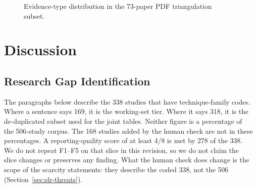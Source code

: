 \begin{figure}[tbp]
\centering
{}
\caption{Evidence-type distribution in the 73-paper PDF triangulation subset.}
\label{fig:pdf-evidence-dist}
\end{figure}


\section{Discussion}
\label{sec:slr-discussion}

\subsection{Research Gap Identification}
\label{sec:slr-gaps}

The paragraphs below describe the 338 studies that have technique-family
codes. Where a sentence says 169, it is the working-set tier. Where it says
318, it is the de-duplicated subset used for the joint tables. Neither
figure is a percentage of the 506-study corpus. The 168 studies added by the
human check are not in these percentages. A reporting-quality score of at
least 4/8 is met by 278 of the 338. We do not repeat F1--F5 on that slice
in this revision, so we do not claim the slice changes or preserves any
finding. What the human check does change is the scope of the scarcity
statements: they describe the coded 338, not the 506
(Section~\ref{sec:slr-threats}).

